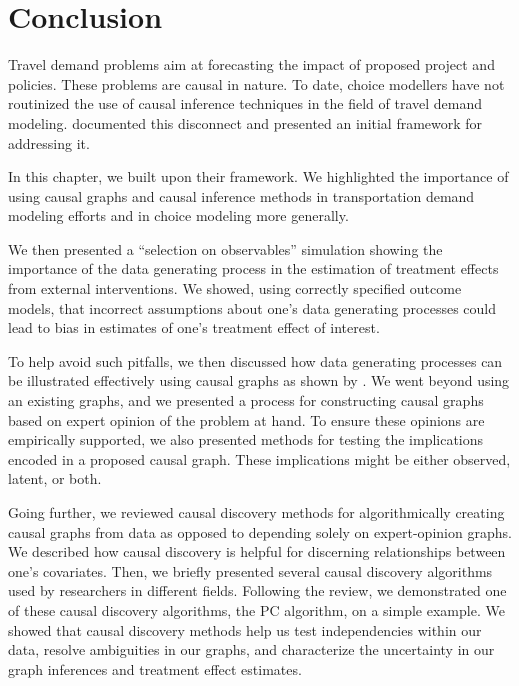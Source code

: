 \section{Conclusion}
\label{sec:conclusion}

Travel demand problems aim at forecasting the impact of proposed project and policies.
These problems are causal in nature.
To date, choice modellers have not routinized the use of causal inference techniques in the field of travel demand modeling.
\citet{brathwaite_2018_causal} documented this disconnect and presented an initial framework for addressing it.

In this chapter, we built upon their framework.
We highlighted the importance of using causal graphs and causal inference methods in transportation demand modeling efforts and in choice modeling more generally.

We then presented a ``selection on observables'' simulation showing the importance of the data generating process in the estimation of treatment effects from external interventions.
We showed, using correctly specified outcome models, that incorrect assumptions about one's data generating processes could lead to bias in estimates of one's treatment effect of interest.

To help avoid such pitfalls, we then discussed how data generating processes can be illustrated effectively using causal graphs as shown by \citet{pearl_1995_causal}.
We went beyond using an existing graphs, and we presented a process for constructing causal graphs based on expert opinion of the problem at hand.
To ensure these opinions are empirically supported, we also presented methods for testing the implications encoded in a proposed causal graph.
These implications might be either observed, latent, or both.

Going further, we reviewed causal discovery methods for algorithmically creating causal graphs from data as opposed to depending solely on expert-opinion graphs.
We described how causal discovery is helpful for discerning relationships between one's covariates.
Then, we briefly presented several causal discovery algorithms used by researchers in different fields.
Following the review, we demonstrated one of these causal discovery algorithms, the PC algorithm, on a simple example.
We showed that causal discovery methods help us test independencies within our data,
resolve ambiguities in our graphs,
and characterize the uncertainty in our graph inferences and treatment effect estimates.

